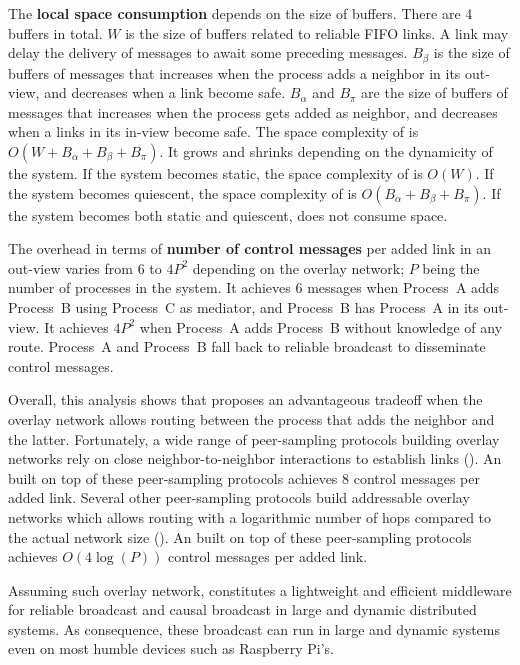 \noindent The \textbf{local space consumption} depends on the size of
buffers. There are 4 buffers in total. $W$ is the size of buffers related to
reliable FIFO links. A link may delay the delivery of messages to await some
preceding messages. $B_\beta$ is the size of buffers of messages that increases when
the process adds a neighbor in its out-view, and decreases when a link become
safe. $B_\alpha$ and $B_\pi$ are the size of buffers of messages that increases
when the process gets added as neighbor, and decreases when a links in its
in-view become safe. The space complexity of \RPCBROADCAST is
$O(W  + B_\alpha + B_\beta + B_\pi)$. It grows and shrinks depending on the dynamicity
of the system. If the system becomes static, the space complexity of
\RPCBROADCAST is $O(W)$. If the system becomes quiescent, the space complexity
of \RPCBROADCAST is $O(B_\alpha+ B_\beta + B_\pi)$.  If the system becomes both
static and quiescent, \RPCBROADCAST does not consume
space. 



\noindent The overhead in terms of \textbf{number of control messages} per added
link in an out-view varies from $6$ to $4P^2$ depending on the overlay network;
$P$ being the number of processes in the system. It achieves $6$ messages when
Process~A adds Process~B using Process~C as mediator, and Process~B has
Process~A in its out-view. It achieves $4P^2$ when Process~A adds Process~B
without knowledge of any route. Process~A and Process~B fall back to reliable
broadcast to disseminate control messages.

Overall, this analysis shows that \RPCBROADCAST proposes an advantageous
tradeoff when the overlay network allows routing between the process that adds
the neighbor and the latter. Fortunately, a wide range of peer-sampling
protocols building overlay networks rely on close neighbor-to-neighbor
interactions to establish links (\REF). An \RPCBROADCAST built on top of these
peer-sampling protocols achieves $8$ control messages per added link. Several
other peer-sampling protocols build addressable overlay networks which allows
routing with a logarithmic number of hops compared to the actual network size
(\REF). An \RPCBROADCAST built on top of these peer-sampling protocols achieves
$O(4\log(P))$ control messages per added link.

Assuming such overlay network, \RPCBROADCAST constitutes a lightweight and
efficient middleware for reliable broadcast and causal broadcast in large and
dynamic distributed systems. As consequence, these broadcast can run in large
and dynamic systems even on most humble devices such as Raspberry Pi's.


